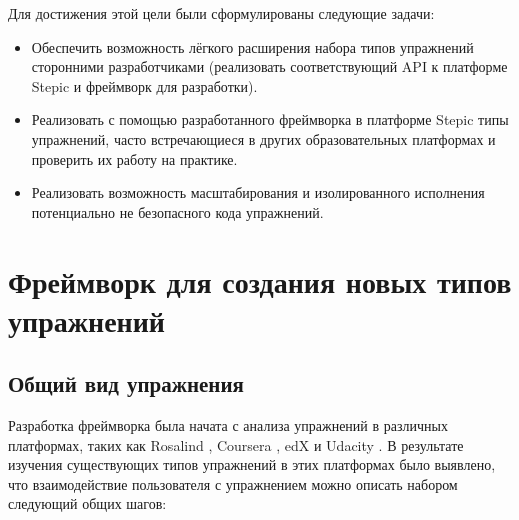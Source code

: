 \documentclass{matmex-diploma-custom}
\begin{document}
Для достижения этой цели были сформулированы следующие задачи:

\begin{itemize}
\item Обеспечить возможность лёгкого расширения набора типов
  упражнений сторонними разработчиками (реализовать соответствующий
  API к платформе Stepic и фреймворк для разработки).
\item Реализовать с помощью разработанного фреймворка в платформе
  Stepic типы упражнений, часто встречающиеся в других образовательных
  платформах и проверить их работу на практике.
\item Реализовать возможность масштабирования и изолированного
  исполнения потенциально не безопасного кода упражнений.
\end{itemize}

\section{Фреймворк для создания новых типов упражнений}

\subsection{Общий вид упражнения}
Разработка фреймворка была начата с анализа упражнений в различных
платформах, таких как Rosalind \cite{rosalind}, Coursera
\cite{coursera}, edX \cite{edx} и Udacity \cite{udacity}. В результате
изучения существующих типов упражнений в этих платформах было
выявлено, что взаимодействие пользователя с упражнением можно описать
набором следующий общих шагов:
\end{document}
